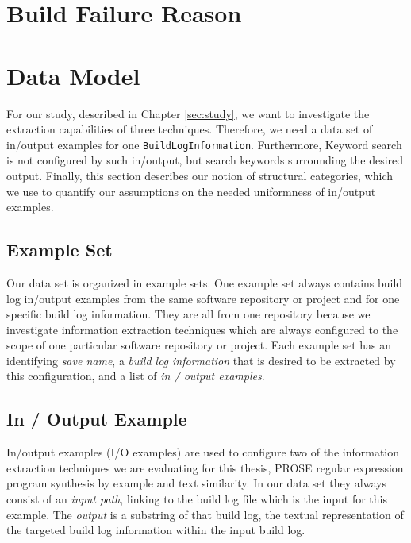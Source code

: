 \documentclass[\myrootdir/main.tex]{subfiles}
\begin{document}
\section{Build Failure Reason}


\section{Data Model}
For our study, described in Chapter \ref{sec:study}, we want to investigate the extraction capabilities of three techniques. Therefore, we need a data set of in/output examples for one \texttt{BuildLogInformation}. Furthermore, Keyword search is not configured by such in/output, but search keywords surrounding the desired output. Finally, this section describes our notion of structural categories, which we use to quantify our assumptions on the needed uniformness of in/output examples.

\subsection{Example Set}
Our data set is organized in example sets. One example set always contains build log in/output examples from the same software repository or project and for one specific build log information. They are all from one repository because we investigate information extraction techniques which are always configured to the scope of one particular software repository or project.
Each example set has an identifying \emph{save name}, a \emph{build log information} that is desired to be extracted by this configuration, and a list of \emph{in / output examples}.

\subsection{In / Output Example}
In/output examples (I/O examples) are used to configure two of the information extraction techniques we are evaluating for this thesis, PROSE regular expression program synthesis by example and text similarity. In our data set they always consist of an \emph{input path}, linking to the build log file which is the input for this example. The \emph{output} is a substring of that build log, the textual representation of the targeted build log information within the input build log.
\end{document}
